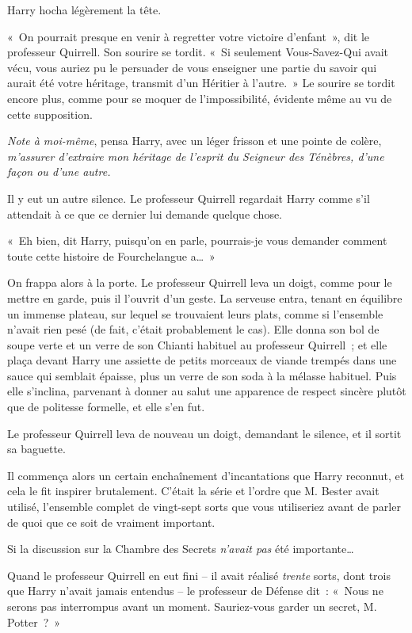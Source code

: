 Harry hocha légèrement la tête.

«~On pourrait presque en venir à regretter votre victoire d'enfant~», dit le professeur Quirrell.
Son sourire se tordit.
«~Si seulement Vous-Savez-Qui avait vécu, vous auriez pu le persuader de vous enseigner une partie du savoir qui aurait été votre héritage, transmit d'un Héritier à l'autre.~»
Le sourire se tordit encore plus, comme pour se moquer de l'impossibilité, évidente même au vu de cette supposition.

\emph{Note à moi-même}, pensa Harry, avec un léger frisson et une pointe de colère, \emph{m'assurer d'extraire mon héritage de l'esprit du Seigneur des Ténèbres, d'une façon ou d'une autre.}

Il y eut un autre silence.
Le professeur Quirrell regardait Harry comme s'il attendait à ce que ce dernier lui demande quelque chose.

«~Eh bien, dit Harry, puisqu'on en parle, pourrais-je vous demander comment toute cette histoire de Fourchelangue a…~»

On frappa alors à la porte.
Le professeur Quirrell leva un doigt, comme pour le mettre en garde, puis il l'ouvrit d'un geste.
La serveuse entra, tenant en équilibre un immense plateau, sur lequel se trouvaient leurs plats, comme si l'ensemble n'avait rien pesé (de fait, c'était probablement le cas).
Elle donna son bol de soupe verte et un verre de son Chianti habituel au professeur Quirrell~; et elle plaça devant Harry une assiette de petits morceaux de viande trempés dans une sauce qui semblait épaisse, plus un verre de son soda à la mélasse habituel.
Puis elle s'inclina, parvenant à donner au salut une apparence de respect sincère plutôt que de politesse formelle, et elle s'en fut.

Le professeur Quirrell leva de nouveau un doigt, demandant le silence, et il sortit sa baguette.

Il commença alors un certain enchaînement d'incantations que Harry reconnut, et cela le fit inspirer brutalement.
C'était la série et l'ordre que M. Bester avait utilisé, l'ensemble complet de vingt-sept sorts que vous utiliseriez avant de parler de quoi que ce soit de vraiment important.

Si la discussion sur la Chambre des Secrets \emph{n'avait pas} été importante…

Quand le professeur Quirrell en eut fini -- il avait réalisé \emph{trente} sorts, dont trois que Harry n'avait jamais entendus -- le professeur de Défense dit~: «~Nous ne serons pas interrompus avant un moment.
Sauriez-vous garder un secret, M. Potter~?~»

